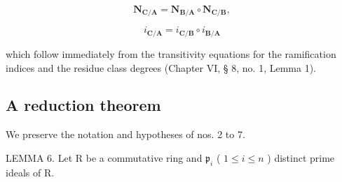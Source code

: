 \[
\mathbf {N} _ {\mathbf {C} / \mathbf {A}} = \mathbf {N} _ {\mathbf {B} / \mathbf {A}} \circ \mathbf {N} _ {\mathbf {C} / \mathbf {B}},\tag{26}
\]

\[
i _ {\mathbf {C} / \mathbf {A}} = i _ {\mathbf {C} / \mathbf {B}} \circ i _ {\mathbf {B} / \mathbf {A}}
\]

which follow immediately from the transitivity equations for the ramification indices and the residue class degrees (Chapter VI, § 8, no. 1, Lemma 1).

\subsection{A reduction theorem}

We preserve the notation and hypotheses of nos. 2 to 7.

LEMMA 6. Let R be a commutative ring and \(\mathfrak{p}_i\) ( \(1 \leqslant i \leqslant n\) ) distinct prime ideals of R.

